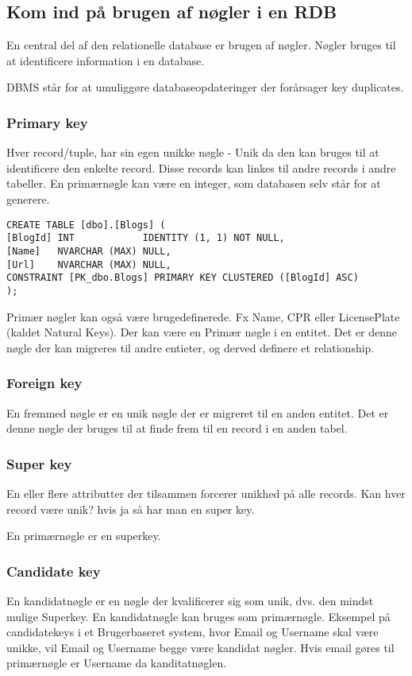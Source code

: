 \subsection{Kom ind på brugen af nøgler i en RDB}\label{sec:keys}
En central del af den relationelle database er brugen af nøgler. Nøgler bruges til at identificere information i en database.

DBMS står for at umuliggøre databaseopdateringer der forårsager key duplicates.

\subsubsection{Primary key}
Hver record/tuple, har sin egen unikke nøgle - Unik da den kan bruges til at identificere den enkelte record. Disse records kan linkes til andre records i andre tabeller. En primærnøgle kan være en integer, som databasen selv står for at generere.


\begin{lstlisting}
CREATE TABLE [dbo].[Blogs] (
[BlogId] INT            IDENTITY (1, 1) NOT NULL,
[Name]   NVARCHAR (MAX) NULL,
[Url]    NVARCHAR (MAX) NULL,
CONSTRAINT [PK_dbo.Blogs] PRIMARY KEY CLUSTERED ([BlogId] ASC)
);
\end{lstlisting}

Primær nøgler kan også være brugedefinerede. Fx Name, CPR eller  LicensePlate (kaldet Natural Keys). Der kan være en Primær nøgle i en entitet. Det er denne nøgle der kan migreres til andre entieter, og derved definere et relationship.
\subsubsection{Foreign key}
En fremmed nøgle er en unik nøgle der er migreret til en anden entitet.
Det er denne nøgle der bruges til at finde frem til en record i en anden tabel.

\subsubsection{Super key}
En eller flere attributter der tilsammen forcerer unikhed på alle records.
Kan hver record være unik? hvis ja så har man en super key. 

En primærnøgle er en superkey.

\subsubsection{Candidate key}
En kandidatnøgle er en nøgle der kvalificerer sig som unik, dvs. den mindst mulige Superkey. En kandidatnøgle kan bruges som primærnøgle. Eksempel på candidatekeys i et Brugerbaseret system, hvor Email og Username skal være unikke, vil Email og Username begge være kandidat nøgler. Hvis email gøres til primærnøgle er Username da kanditatnøglen.

